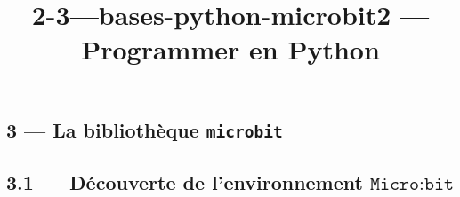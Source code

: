 \documentclass[a4paper,17pt]{extarticle}
\title{2-3---bases-python-microbit}
\begin{document}
    
    \title{2 --- Programmer en Python}

    
    

    
    \hypertarget{la-bibliothuxe8que-microbit}{%
\subsection{\texorpdfstring{3 --- La bibliothèque
\texttt{microbit}}{3 --- La bibliothèque microbit}}\label{la-bibliothuxe8que-microbit}}

    \hypertarget{duxe9couverte-de-lenvironnement-textttmicrobit}{%
\subsection{\texorpdfstring{3.1 --- Découverte de l'environnement
\(\texttt{Micro:bit}\)}{3.1 --- Découverte de l'environnement \textbackslash texttt\{Micro:bit\}}}\label{duxe9couverte-de-lenvironnement-textttmicrobit}}
\end{document}
